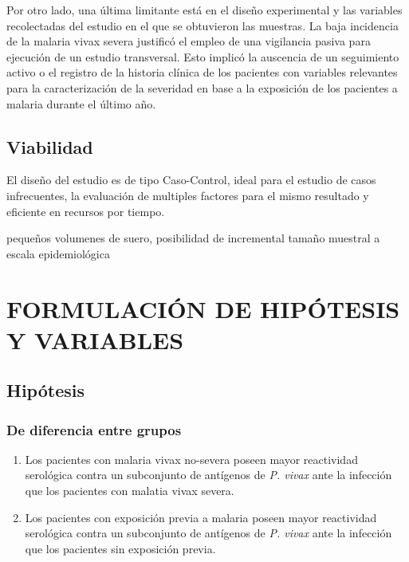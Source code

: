 \documentclass[]{article}
\begin{document}
Por otro lado, una última limitante está en el diseño experimental y las
variables recolectadas del estudio en el que se obtuvieron las muestras.
La baja incidencia de la malaria vivax severa justificó el empleo de una
vigilancia pasiva para ejecución de un estudio transversal. Esto implicó
la auscencia de un seguimiento activo o el registro de la historia
clínica de los pacientes con variables relevantes para la
caracterización de la severidad en base a la exposición de los pacientes
a malaria durante el último año.

\subsection{Viabilidad}\label{viabilidad}

El diseño del estudio es de tipo Caso-Control, ideal para el estudio de
casos infrecuentes, la evaluación de multiples factores para el mismo
resultado y eficiente en recursos por tiempo.

pequeños volumenes de suero, posibilidad de incremental tamaño muestral
a escala epidemiológica

\section{FORMULACIÓN DE HIPÓTESIS Y
VARIABLES}\label{formulacion-de-hipotesis-y-variables}

\subsection{Hipótesis}\label{hipotesis}

\subsubsection{De diferencia entre
grupos}\label{de-diferencia-entre-grupos}

\begin{enumerate}
\def\labelenumi{\arabic{enumi}.}
\item
  Los pacientes con malaria vivax no-severa poseen mayor reactividad
  serológica contra un subconjunto de antígenos de \emph{P. vivax} ante
  la infección que los pacientes con malatia vivax severa.
\item
  Los pacientes con exposición previa a malaria poseen mayor reactividad
  serológica contra un subconjunto de antígenos de \emph{P. vivax} ante
  la infección que los pacientes sin exposición previa.
\end{enumerate}
\end{document}
